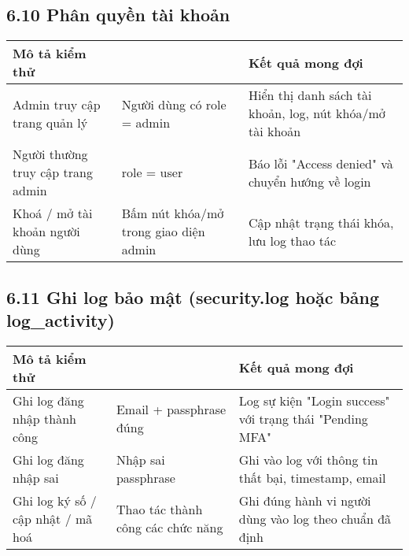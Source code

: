\subsection*{6.10 Phân quyền tài khoản}
\begin{table}[H]
\centering
\begin{tabular}{|>{\centering\arraybackslash}p{4.3cm}|>{\arraybackslash}p{5cm}|>{\centering\arraybackslash}p{7.5cm}|}
\hline
\textbf{Mô tả kiểm thử} &
\multicolumn{1}{>{\centering\arraybackslash}p{5cm}|}{\textbf{Input}} & 
\textbf{Kết quả mong đợi} \\ \hline
Admin truy cập trang quản lý & Người dùng có role = admin & Hiển thị danh sách tài khoản, log, nút khóa/mở tài khoản \\ \hline
Người thường truy cập trang admin & role = user & Báo lỗi "Access denied" và chuyển hướng về login \\ \hline
Khoá / mở tài khoản người dùng & Bấm nút khóa/mở trong giao diện admin & Cập nhật trạng thái khóa, lưu log thao tác \\ \hline
\end{tabular}
\end{table}

\subsection*{6.11 Ghi log bảo mật (security.log hoặc bảng log\_activity)}
\begin{table}[H]
\centering
\begin{tabular}{|>{\centering\arraybackslash}p{4.3cm}|>{\arraybackslash}p{5cm}|>{\centering\arraybackslash}p{7.5cm}|}
\hline
\textbf{Mô tả kiểm thử} &
\multicolumn{1}{>{\centering\arraybackslash}p{5cm}|}{\textbf{Input}} & 
\textbf{Kết quả mong đợi} \\ \hline
Ghi log đăng nhập thành công & Email + passphrase đúng & Log sự kiện "Login success" với trạng thái "Pending MFA" \\ \hline
Ghi log đăng nhập sai & Nhập sai passphrase & Ghi vào log với thông tin thất bại, timestamp, email \\ \hline
Ghi log ký số / cập nhật / mã hoá & Thao tác thành công các chức năng & Ghi đúng hành vi người dùng vào log theo chuẩn đã định \\ \hline
\end{tabular}
\end{table}

